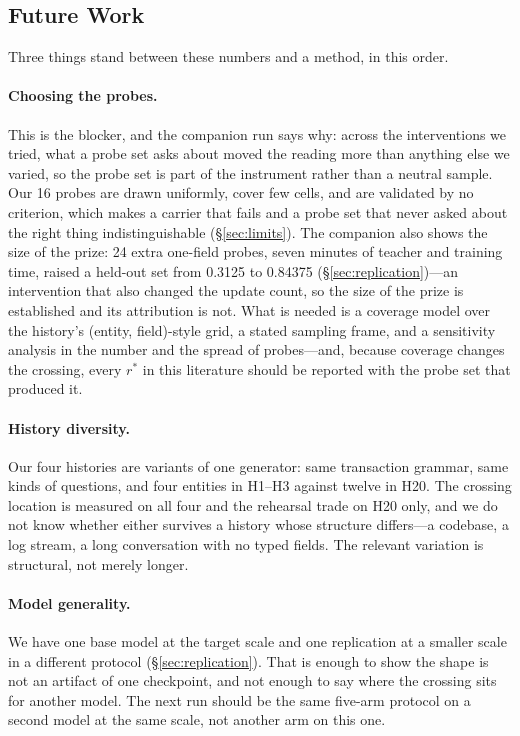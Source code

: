 \documentclass[sigconf,nonacm]{acmart}
\begin{document}
\subsection{Future Work}\label{sec:future}

Three things stand between these numbers and a method, in this order.

\paragraph{Choosing the probes.} This is the blocker, and the companion run says why: across the interventions we
tried, what a probe set asks about moved the reading more than anything else we varied, so the probe set is part of
the instrument rather than a neutral sample. Our 16 probes are drawn uniformly, cover few cells, and are validated
by no criterion, which makes a carrier that fails and a probe set that never asked about the right thing
indistinguishable (\S\ref{sec:limits}). The companion also shows the size of the prize: 24 extra one-field probes,
seven minutes of teacher and training time, raised a held-out set from 0.3125 to 0.84375
(\S\ref{sec:replication})---an intervention that also changed the update count, so the size of the prize is
established and its attribution is not. What is needed is a coverage model over the history's (entity, field)-style grid, a
stated sampling frame, and a sensitivity analysis in the number and the spread of probes---and, because coverage
changes the crossing, every $r^\ast$ in this literature should be reported with the probe set that produced it.

\paragraph{History diversity.} Our four histories are variants of one generator: same transaction grammar, same
kinds of questions, and four entities in H1--H3 against twelve in H20. The crossing location is measured on all
four and the rehearsal trade on H20 only, and we do not know whether either survives a history whose structure
differs---a codebase, a log stream, a long conversation with no typed fields. The relevant variation is
structural, not merely longer.

\paragraph{Model generality.} We have one base model at the target scale and one replication at a smaller scale
in a different protocol (\S\ref{sec:replication}). That is enough to show the shape is not an artifact of one
checkpoint, and not enough to say where the crossing sits for another model. The next run should be the same
five-arm protocol on a second model at the same scale, not another arm on this one.
\end{document}
